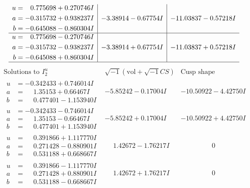 \documentclass[1p]{elsarticle_modified}
\theoremstyle{definition}
\newcommand{\I}{\sqrt{-1}}
\begin{document}
$$\begin{array}{c|c|c}
\begin{aligned}
u &= \phantom{-}0.775698 + 0.270746 I \\
a &= -0.315732 + 0.938237 I \\
b &= -0.645088 - 0.860304 I\end{aligned}
 & -3.38914 - 0.67754 I & -11.03837 - 0.57218 I \\ \hline\begin{aligned}
u &= \phantom{-}0.775698 - 0.270746 I \\
a &= -0.315732 - 0.938237 I \\
b &= -0.645088 + 0.860304 I\end{aligned}
 & -3.38914 + 0.67754 I & -11.03837 + 0.57218 I\\
 \hline 
 \end{array}$$\newpage$$\begin{array}{c|c|c}  
\text{Solutions to }I^u_{2}& \I (\text{vol} + \sqrt{-1}CS) & \text{Cusp shape}\\
 \hline 
\begin{aligned}
u &= -0.342433 + 0.746014 I \\
a &= \phantom{-}1.35153 + 0.66467 I \\
b &= \phantom{-}0.477401 - 1.153940 I\end{aligned}
 & -5.85242 - 0.17004 I & -10.50922 - 4.42750 I \\ \hline\begin{aligned}
u &= -0.342433 - 0.746014 I \\
a &= \phantom{-}1.35153 - 0.66467 I \\
b &= \phantom{-}0.477401 + 1.153940 I\end{aligned}
 & -5.85242 + 0.17004 I & -10.50922 + 4.42750 I \\ \hline\begin{aligned}
u &= \phantom{-}0.391866 + 1.117770 I \\
a &= \phantom{-}0.271428 - 0.880901 I \\
b &= \phantom{-}0.531188 + 0.668667 I\end{aligned}
 & \phantom{-}1.42672 - 1.76217 I & \phantom{-0.000000 } 0 \\ \hline\begin{aligned}
u &= \phantom{-}0.391866 - 1.117770 I \\
a &= \phantom{-}0.271428 + 0.880901 I \\
b &= \phantom{-}0.531188 - 0.668667 I\end{aligned}
 & \phantom{-}1.42672 + 1.76217 I & \phantom{-0.000000 } 0 \\ \hline\begin{aligned}

\end{aligned}
\end{array}$$
\end{document}

